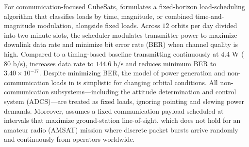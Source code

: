 For communication-focused CubeSats, \cite{husseinOptimizedLoadSchedulingAlgorithm2023} formulates a fixed-horizon load-scheduling algorithm that classifies loads by time, magnitude, or combined time-and-magnitude modulation, alongside fixed loads. Across $12$ orbits per day divided into two-minute slots, the scheduler modulates transmitter power to maximize downlink data rate and minimize bit error rate (BER) when channel quality is high. Compared to a timing-based baseline transmitting continuously at $4.4\text{ W}$ ($80\text{ b/s}$), \cite{husseinOptimizedLoadSchedulingAlgorithm2023} increases data rate to $144.6\text{ b/s}$ and reduces minimum BER to $3.40 \times 10^{-17}$. Despite minimizing BER, the model of power generation and non-communication loads in \cite{husseinOptimizedLoadSchedulingAlgorithm2023} is simplistic for changing orbital conditions. All non-communication subsystems---including the attitude determination and control system (ADCS)---are treated as fixed loads, ignoring pointing and slewing power demands. Moreover, \cite{husseinOptimizedLoadSchedulingAlgorithm2023} assumes a fixed communication payload scheduled at intervals that maximize ground-station line-of-sight, which does not hold for an amateur radio (AMSAT) mission where discrete packet bursts arrive randomly and continuously from operators worldwide.


